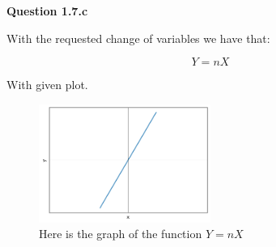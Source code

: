 \documentclass[a4paper,12pt]{article}
\begin{document}
\vspace{0.4cm}

\noindent \textbf{\LARGE Question 1.7.c}

\vspace{0.2cm}

With the requested change of variables we have that:

\begin{equation}
    Y = n X
\end{equation}

With given plot.

\begin{figure}[h]
    \centering
    \includegraphics[width=0.5\textwidth]{First Lab Theory first image.png}
    \caption{Here is the graph of the function $Y = nX$} 

\vspace{0.5cm}



\end{figure}
\end{document}
